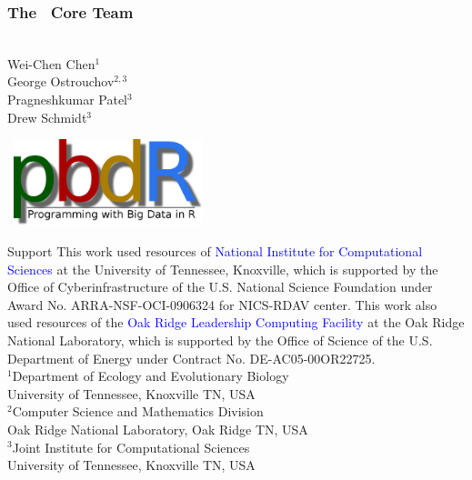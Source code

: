 \frame{\maketitle}

\setcounter{footnote}{0}

\begin{frame}[noframenumbering]
\frametitle{The \pbdR\ Core Team}
\begin{minipage}{1\textwidth}
  \vspace{-.6cm}
\begin{minipage}{3.6cm}
\ \\[.8cm]
Wei-Chen Chen$^1$ \\
George Ostrouchov$^{2,3}$ \\
Pragneshkumar Patel$^3$ \\
Drew Schmidt$^3$\\[2ex]
\end{minipage}
\begin{minipage}{7cm}
  \ \hfill \includegraphics[width=5.5cm]{../common/pics/logos/newpbdr}
\end{minipage}
\end{minipage}

\vspace{-.4cm}
\begin{block}{Support}\tiny
  This work used resources of \textcolor{blue}{National Institute for
  Computational Sciences} at the University of Tennessee, Knoxville,
  which is supported by the Office of Cyberinfrastructure of the
  U.S. National Science Foundation under Award  No. ARRA-NSF-OCI-0906324 
  for NICS-RDAV center. 
  This work also used resources of the \textcolor{blue}{Oak Ridge
  Leadership Computing Facility} at the Oak Ridge National
  Laboratory, which is supported by the Office of Science of the
  U.S. Department of Energy under Contract No. DE-AC05-00OR22725.\\[.2cm]
  
  $^1$Department of Ecology and Evolutionary Biology\\
  University of Tennessee, Knoxville TN, USA\\[.2cm]

  $^2$Computer Science and Mathematics Division\\
  Oak Ridge National Laboratory, Oak Ridge TN, USA\\[.2cm]
  
  $^3$Joint Institute for Computational Sciences\\
  University of Tennessee, Knoxville TN, USA
\end{block}
\end{frame}




